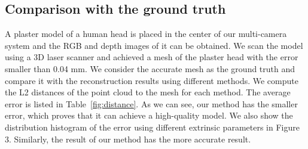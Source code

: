 \documentclass{article}
\begin{document}
\subsection{Comparison with the ground truth}

A plaster model of a  human head is placed in the center of our multi-camera system and the RGB and depth images of it can be obtained. We scan the model using a 3D laser scanner and achieved a mesh of the plaster head with the error smaller than 0.04 mm. We consider the accurate mesh as the ground truth and compare it with the reconstruction results using different methods. We compute the L2 distances of the point cloud to the mesh for each method. The average error is listed in Table~\ref{fig:distance}. As we can see, our method has the smaller error, which proves that it can achieve a high-quality model. We also show the distribution histogram of the error using different extrinsic parameters in Figure 3. Similarly, the result of our method has the more accurate result.
\end{document}
